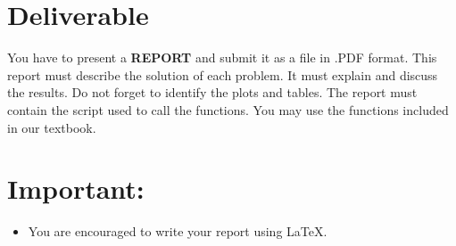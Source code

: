 \documentclass{article}
\begin{document}
\section*{Deliverable}
You have to present a \textbf{REPORT} and submit it as a file in .PDF format. This report must describe the solution of each problem. It must explain and discuss the results. Do not forget to identify the plots and tables. The report must contain the script used to call the functions. You may use the functions included in our textbook.\\

\section*{Important:}
\begin{itemize}
	\item You are encouraged to write your report using \LaTeX. 
\end{itemize}
 
\end{document}
